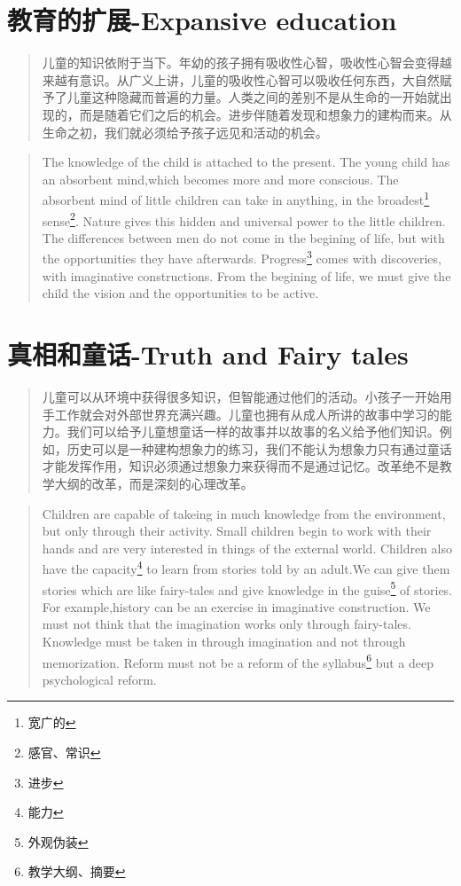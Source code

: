 \documentclass[lang=cn,10pt]{elegantbook}
\begin{document}
\chapter{教育的扩展-Expansive education}

\begin{quote}
  {\small 儿童的知识依附于当下。年幼的孩子拥有吸收性心智，吸收性心智会变得越来越有意识。从广义上讲，儿童的吸收性心智可以吸收任何东西，大自然赋予了儿童这种隐藏而普遍的力量。人类之间的差别不是从生命的一开始就出现的，而是随着它们之后的机会。进步伴随着发现和想象力的建构而来。从生命之初，我们就必须给予孩子远见和活动的机会。}
\end{quote}

\begin{tcolorbox}
  \begin{quote}
    {\small The knowledge of the child is attached to the present. The young child has an absorbent mind,which becomes more and more conscious. The absorbent mind of little children can take in anything, in the broadest\footnote{宽广的} sense\footnote{感官、常识}. Nature gives this hidden and universal power to the little children. The differences between men do not come in the begining of life, but with the opportunities they have afterwards. Progress\footnote{进步} comes with discoveries, with imaginative constructions. From the begining of life, we must give the child the vision and the opportunities to be active.}
  \end{quote}
\end{tcolorbox}


\chapter{真相和童话-Truth and Fairy tales}
\begin{quote}
  {\small 儿童可以从环境中获得很多知识，但智能通过他们的活动。小孩子一开始用手工作就会对外部世界充满兴趣。儿童也拥有从成人所讲的故事中学习的能力。我们可以给予儿童想童话一样的故事并以故事的名义给予他们知识。例如，历史可以是一种建构想象力的练习，我们不能认为想象力只有通过童话才能发挥作用，知识必须通过想象力来获得而不是通过记忆。改革绝不是教学大纲的改革，而是深刻的心理改革。}
\end{quote}

\begin{tcolorbox}
\begin{quote}
  {\small Children are capable of takeing in much knowledge from the environment, but only through their activity. Small children begin to work with their hands and are very interested in things of the external world. Children also have the capacity\footnote{能力} to learn from stories told by an adult.We can give them stories which are like fairy-tales and give knowledge in the guise\footnote{外观伪装} of stories. For example,history can be an exercise in imaginative construction. We must not think that the imagination works only through fairy-tales. Knowledge must be taken in through imagination and not through memorization. Reform must not be a reform of the syllabus\footnote{教学大纲、摘要} but a deep psychological reform.}
\end{quote}
\end{tcolorbox}
\end{document}
